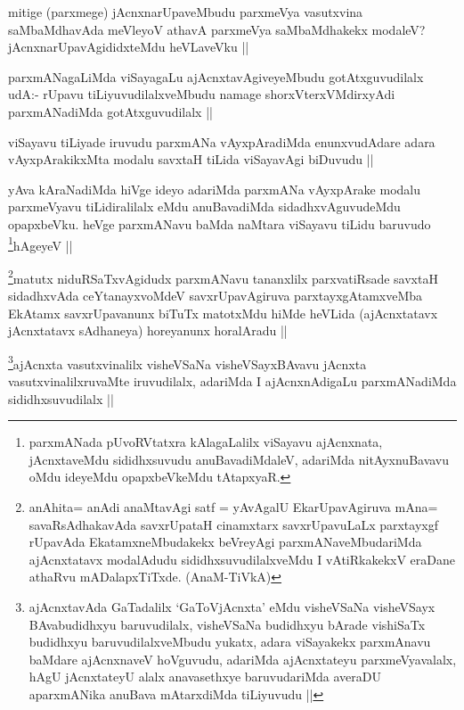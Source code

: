 \begin{artha}
mitige (parxmege) jAcnxnarUpaveMbudu parxmeVya vasutxvina saMbaMdhavAda meVleyoV athavA parxmeVya saMbaMdhakekx modaleV? jAcnxnarUpavAgididxteMdu heVLaveVku ||
\end{artha}

\begin{artha}
parxmANagaLiMda viSayagaLu ajAcnxtavAgiveyeMbudu gotAtxguvudilalx udA:- rUpavu tiLiyuvudilalxveMbudu namage shorxVterxVMdirxyAdi parxmANadiMda gotAtxguvudilalx ||
\end{artha}

\begin{artha}
viSayavu tiLiyade iruvudu parxmANa vAyxpAradiMda enunxvudAdare adara vAyxpArakikxMta modalu savxtaH tiLida viSayavAgi biDuvudu ||
\end{artha}

\begin{artha}
yAva kAraNadiMda hiVge ideyo adariMda parxmANa vAyxpArake modalu parxmeVyavu tiLidiralilalx eMdu anuBavadiMda sidadhxvAguvudeMdu opapxbeVku. heVge parxmANavu baMda naMtara viSayavu tiLidu baruvudo \footnote{parxmANada pUvoRVtatxra kAlagaLalilx viSayavu ajAcnxnata, jAcnxtaveMdu sididhxsuvudu anuBavadiMdaleV, adariMda nitAyxnuBavavu oMdu ideyeMdu opapxbeVkeMdu tAtapxyaR.}hAgeyeV ||
\end{artha}

\begin{artha}
\footnote{anAhita= anAdi anaMtavAgi satf = yAvAgalU EkarUpavAgiruva mAna= savaRsAdhakavAda savxrUpataH cinamxtarx savxrUpavuLaLx parxtayxgf rUpavAda EkatamxneMbudakekx beVreyAgi parxmANaveMbudariMda ajAcnxtatavx modalAdudu sididhxsuvudilalxveMdu I vAtiRkakekxV eraDane athaRvu mADalapxTiTxde. (AnaM-TiVkA)}matutx niduRSaTxvAgidudx parxmANavu tananxlilx parxvatiRsade savxtaH sidadhxvAda ceYtanayxvoMdeV savxrUpavAgiruva parxtayxgAtamxveMba EkAtamx savxrUpavanunx biTuTx matotxMdu hiMde heVLida (ajAcnxtatavx jAcnxtatavx sAdhaneya) horeyanunx horalAradu ||
\end{artha}

\begin{artha}
\footnote{ajAcnxtavAda GaTadalilx `GaToVjAcnxta' eMdu visheVSaNa visheVSayx BAvabudidhxyu baruvudilalx, visheVSaNa budidhxyu bArade vishiSaTx budidhxyu baruvudilalxveMbudu yukatx, adara viSayakekx parxmAnavu baMdare ajAcnxnaveV hoVguvudu, adariMda ajAcnxtateyu parxmeVyavalalx, hAgU jAcnxtateyU alalx anavasethxye baruvudariMda averaDU aparxmANika anuBava mAtarxdiMda tiLiyuvudu ||}ajAcnxta vasutxvinalilx visheVSaNa visheVSayxBAvavu jAcnxta vasutxvinalilxruvaMte iruvudilalx, adariMda I ajAcnxnAdigaLu parxmANadiMda sididhxsuvudilalx ||
\end{artha}

